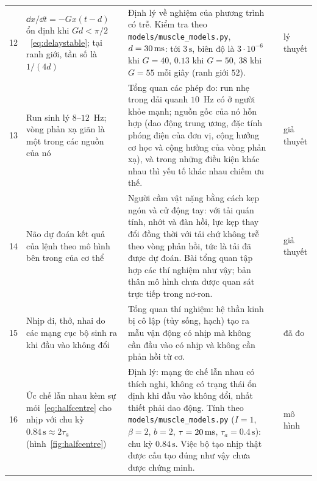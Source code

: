 {\begin{longtable}{>{\raggedright}p{0.5cm}>{\raggedright}p{4.0cm}>{\raggedright}p{5.6cm}>{\raggedright}p{2.3cm}>{\raggedright\arraybackslash}p{1.7cm}}
12 & $\dd x/\dd t=-Gx(t-d)$ ổn định khi $Gd<\pi/2$~\eqref{eq:delaystable}; tại ranh giới, tần số là $1/(4d)$ & Định lý về nghiệm của phương trình có trễ. Kiểm tra theo \texttt{models/\allowbreak muscle\_\allowbreak models.py}, $d=30\,\text{ms}$: tới $3\,\text{s}$, biên độ là $3\cdot10^{-6}$ khi $G=40$, $0.13$ khi $G=50$, $38$ khi $G=55$ mỗi giây (ranh giới $52$). & \cite{Hayes1950} & lý thuyết \\
13 & Run sinh lý $8$--$12$~Hz; vòng phản xạ giãn là một trong các nguồn của nó & Tổng quan các phép đo: run nhẹ trong dải quanh $10$~Hz có ở người khỏe mạnh; nguồn gốc của nó hỗn hợp (dao động trung ương, đặc tính phóng điện của đơn vị, cộng hưởng cơ học và cộng hưởng của vòng phản xạ), và trong những điều kiện khác nhau thì yếu tố khác nhau chiếm ưu thế. & \cite{McAuleyMarsden2000} & giả thuyết \\
14 & Não dự đoán kết quả của lệnh theo mô hình bên trong của cơ thể & Người cầm vật nặng bằng cách kẹp ngón và cử động tay: với tải quán tính, nhớt và đàn hồi, lực kẹp thay đổi đồng thời với tải chứ không trễ theo vòng phản hồi, tức là tải đã được dự đoán. Bài tổng quan tập hợp các thí nghiệm như vậy; bản thân mô hình chưa được quan sát trực tiếp trong nơ-ron. & \cite{FlanaganWing1997grip, WolpertGhahramani2000} & giả thuyết \\
15 & Nhịp đi, thở, nhai do các mạng cục bộ sinh ra khi đầu vào không đổi & Tổng quan thí nghiệm: hệ thần kinh bị cô lập (tủy sống, hạch) tạo ra mẫu vận động có nhịp mà không cần đầu vào có nhịp và không cần phản hồi từ cơ. & \cite{MarderBucher2001} & đã đo \\
16 & Ức chế lẫn nhau kèm sự mỏi~\eqref{eq:halfcentre} cho nhịp với chu kỳ $0.84\,\text{s}\approx2\tau_a$ (hình~\ref{fig:halfcentre}) & Định lý: mạng ức chế lẫn nhau có thích nghi, không có trạng thái ổn định khi đầu vào không đổi, nhất thiết phải dao động. Tính theo \texttt{models/\allowbreak muscle\_\allowbreak models.py} ($I=1$, $\beta=2$, $b=2$, $\tau=20\,\text{ms}$, $\tau_a=0.4\,\text{s}$): chu kỳ $0.84\,\text{s}$. Việc bộ tạo nhịp thật được cấu tạo đúng như vậy chưa được chứng minh. & \cite{Matsuoka1985osc} & mô hình \\
\bottomrule
\end{longtable}}

